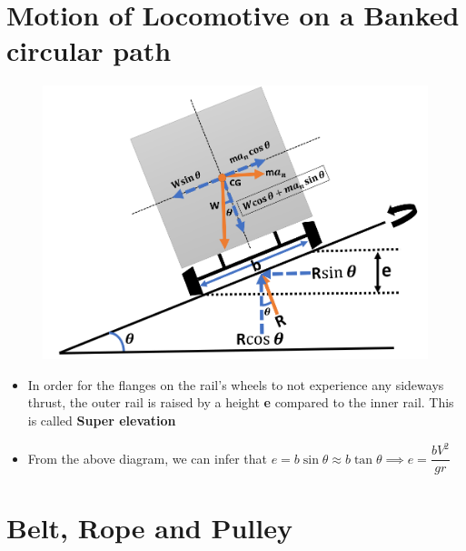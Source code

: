 \documentclass[8pt]{report}
\begin{document}
\section{Motion of Locomotive on a Banked circular path}
	\begin{figure}[H]
		\centering
		\includegraphics[scale=0.5]{locomotive_banked.png}
	\end{figure}
	\begin{itemize}
		\item In order for the flanges on the rail's wheels to not experience any sideways thrust, the outer rail is raised by a height \textbf{e} compared to the inner rail. This is called \textbf{Super elevation}
		\item From the above diagram, we can infer that $e = b\sin\theta \approx b\tan\theta \implies \boxed{e = \dfrac{bV^2}{gr}}$
	\end{itemize}\hrulefill
\section{Belt, Rope and Pulley}
\end{document}
